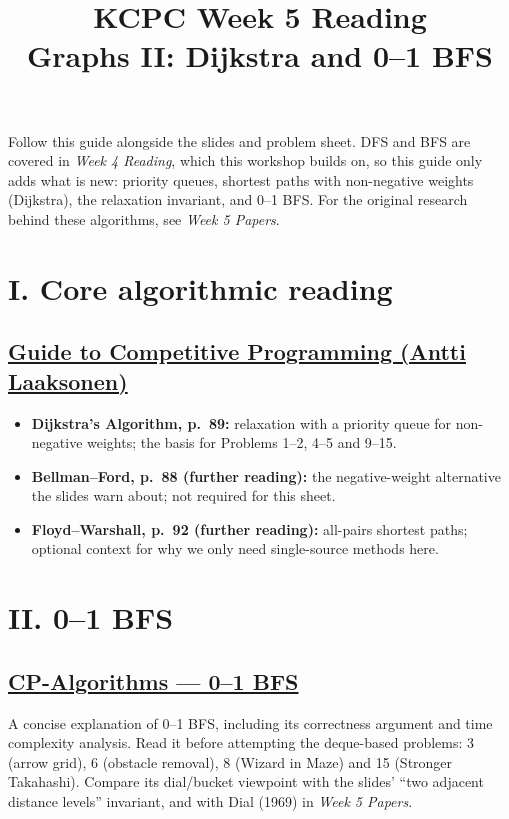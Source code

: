 \documentclass[11pt]{article}
\title{KCPC Week 5 Reading\\Graphs II: Dijkstra and 0--1 BFS}
\author{}\date{}
\begin{document}
\maketitle\thispagestyle{fancy}

Follow this guide alongside the slides and problem sheet. DFS and BFS are covered in \emph{Week 4 Reading}, which this workshop builds on, so this guide only adds what is new: priority queues, shortest paths with non-negative weights (Dijkstra), the relaxation invariant, and 0--1 BFS. For the original research behind these algorithms, see \emph{Week 5 Papers}.

\section*{I. Core algorithmic reading}
\subsection*{\href{https://duoblogger.github.io/assets/pdf/memonvyftw/guide-t-cp.pdf}{Guide to Competitive Programming (Antti Laaksonen)}}
\begin{itemize}
  \item \textbf{Dijkstra's Algorithm, p.~89:} relaxation with a priority queue for non-negative weights; the basis for Problems 1--2, 4--5 and 9--15.
  \item \textbf{Bellman--Ford, p.~88 (further reading):} the negative-weight alternative the slides warn about; not required for this sheet.
  \item \textbf{Floyd--Warshall, p.~92 (further reading):} all-pairs shortest paths; optional context for why we only need single-source methods here.
\end{itemize}

\section*{II. 0--1 BFS}
\subsection*{\href{https://cp-algorithms.com/graph/01_bfs.html}{CP-Algorithms --- 0--1 BFS}}

A concise explanation of 0--1 BFS, including its correctness argument and time complexity analysis. Read it before attempting the deque-based problems: 3 (arrow grid), 6 (obstacle removal), 8 (Wizard in Maze) and 15 (Stronger Takahashi). Compare its dial/bucket viewpoint with the slides' ``two adjacent distance levels'' invariant, and with Dial (1969) in \emph{Week 5 Papers}.
\end{document}
